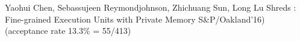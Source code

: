 \begin{cventries}
  \cventry
    {Yaohui Chen, Sebassujeen Reymondjohnson, Zhichuang Sun, Long Lu}
    {Shreds : Fine-grained Execution Units with Private Memory}
    {S\&P/Oakland'16)}
    {(acceptance rate 13.3\% = 55/413)}
    {}
\end{cventries}